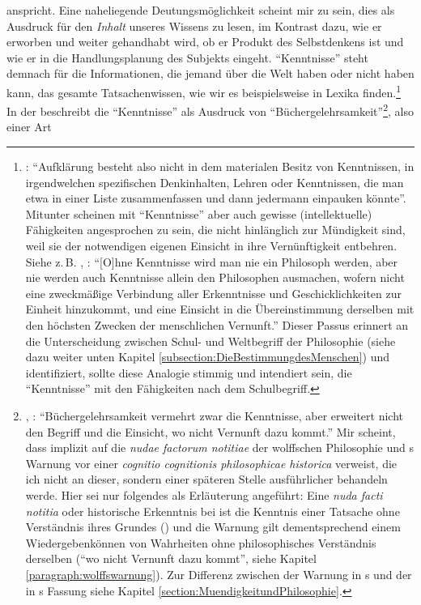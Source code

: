 anspricht. Eine naheliegende Deutungsmöglichkeit scheint mir zu sein, dies als
Ausdruck für den \emph{Inhalt} unseres Wissens zu lesen, im Kontrast dazu, wie
er erworben und weiter gehandhabt wird, ob er Produkt des Selbstdenkens ist und
wie er in die Handlungsplanung des Subjekts eingeht. \enquote{Kenntnisse} steht
demnach für die Informationen, die jemand über die Welt haben oder nicht haben
kann, das gesamte Tatsachenwissen, wie wir es beispielsweise in Lexika
finden.\footnote{\cite[Vgl.][32]{Scholz:KantsAufklaerungsprogramm2009}:
\enquote{Aufklärung besteht also nicht in dem materialen Besitz von Kenntnissen,
in irgendwelchen spezifischen Denkinhalten, Lehren oder Kenntnissen, die man
etwa in einer Liste zusammenfassen und dann jedermann einpauken könnte}.
Mitunter scheinen mit \enquote{Kenntnisse} aber auch gewisse (intellektuelle) Fähigkeiten
angesprochen zu sein, die nicht hinlänglich zur Mündigkeit sind, weil sie der
notwendigen eigenen Einsicht in ihre Vernünftigkeit entbehren. Siehe
z.\,B. \cite[][A~26]{Kant:ImmanuelKantsLogik1977}, \cite[][IX:
25.21--26]{Kant:GesammelteWerke1900ff.}: \enquote{[O]hne Kenntnisse wird man
nie ein Philosoph werden, aber nie werden auch Kenntnisse allein den
Philosophen ausmachen, wofern nicht eine zweckmäßige Verbindung aller
Erkenntnisse und Geschicklichkeiten zur Einheit hinzukommt, und eine Einsicht
in die Übereinstimmung derselben mit den höchsten Zwecken der menschlichen
Vernunft.} Dieser Passus erinnert an die Unterscheidung zwischen Schul- und
Weltbegriff der Philosophie (siehe dazu weiter unten Kapitel
\ref{subsection:DieBestimmungdesMenschen}) und identifiziert, sollte diese
Analogie stimmig und intendiert sein, die \enquote{Kenntnisse} mit den
Fähigkeiten nach dem Schulbegriff.} In der  beschreibt  die \enquote{Kenntnisse} als Ausdruck
von
\enquote{Büchergelehrsamkeit}\footnote{\cite[Vgl.][BA~166]{Kant:AnthropologieinpragmatischerHinsicht1977},
\cite[][VII: 228.14--16]{Kant:GesammelteWerke1900ff.}:
\enquote{Büchergelehrsamkeit vermehrt zwar die Kenntnisse, aber erweitert nicht
den Begriff und die Einsicht, wo nicht Vernunft dazu kommt.} Mir scheint, dass
 implizit auf die \emph{nudae factorum notitiae} der
wolffschen Philosophie und
s Warnung vor einer \emph{cognitio
cognitionis philosophicae historica} verweist, die ich nicht an dieser, sondern
einer späteren Stelle ausführlicher behandeln werde. Hier sei nur folgendes als
Erläuterung angeführt: Eine \emph{nuda facti notitia} oder historische Erkenntnis bei
 ist die Kenntnis einer Tatsache ohne Verständnis ihres Grundes
(\cite[vgl.][\S~7]{Wolff:Discursuspraeliminarisdephilosophiaingenere1996}) und
die Warnung gilt dementsprechend einem Wiedergebenkönnen von Wahrheiten ohne
philosophisches Verständnis derselben (\enquote{wo nicht Vernunft dazu kommt},
siehe Kapitel \ref{paragraph:wolffswarnung}).
Zur Differenz zwischen der Warnung in
s und der in s
Fassung siehe Kapitel \ref{section:MuendigkeitundPhilosophie}.}, also einer Art

